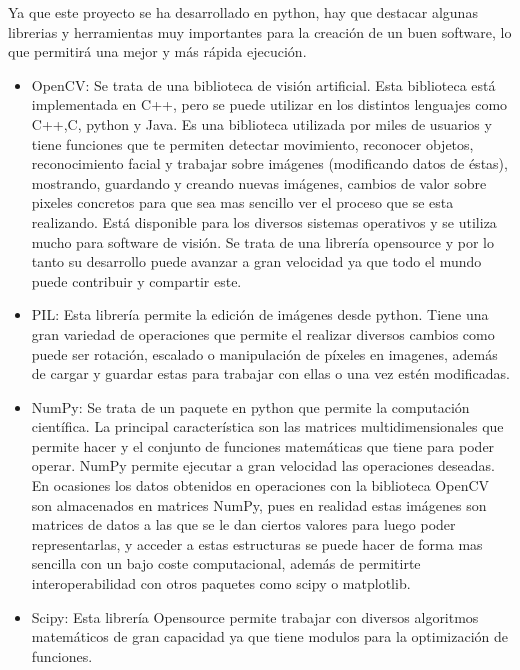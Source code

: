 \hspace{1 cm} Ya que este proyecto se ha desarrollado en python, hay que destacar algunas librerias y herramientas muy importantes para la creaci\'on de un buen software, lo que permitir\'a una mejor y m\'as r\'apida ejecuci\'on. 
	\begin{itemize}
	\item OpenCV: Se trata de una biblioteca de visi\'on artificial. Esta biblioteca est\'a implementada en C++, pero se puede utilizar en los distintos lenguajes como C++,C, python y Java. Es una biblioteca utilizada por miles de usuarios y tiene funciones que te permiten detectar movimiento, reconocer objetos, reconocimiento facial y trabajar sobre im\'agenes (modificando datos de \'estas), mostrando, guardando y creando nuevas im\'agenes, cambios de valor sobre pixeles concretos para que sea mas sencillo ver el proceso que se esta realizando. Est\'a disponible para los diversos sistemas operativos y se utiliza mucho para software de visi\'on. Se trata de una librer\'ia opensource y por lo tanto su desarrollo puede avanzar a gran velocidad ya que todo el mundo puede contribuir y compartir este.
	
	\item PIL: Esta librer\'ia permite la edici\'on de im\'agenes desde python. Tiene una gran variedad de operaciones que permite el realizar diversos cambios como puede ser rotaci\'on, escalado o manipulaci\'on de p\'ixeles en imagenes, adem\'as de cargar y guardar estas para trabajar con ellas o una vez est\'en modificadas. 
	
	\item NumPy: Se trata de un paquete en python que permite la computaci\'on cient\'ifica. La principal caracter\'istica son las matrices multidimensionales que permite hacer y el conjunto de funciones matem\'aticas que tiene para poder operar. NumPy permite ejecutar a gran velocidad las operaciones deseadas. En ocasiones los datos obtenidos en operaciones con la biblioteca OpenCV son almacenados en matrices NumPy, pues en realidad estas im\'agenes son matrices de datos a las que se le dan ciertos valores para luego poder representarlas, y acceder a estas estructuras se puede hacer de forma mas sencilla con un bajo coste computacional, adem\'as de permitirte interoperabilidad con otros paquetes como scipy o matplotlib. 

	\item Scipy: Esta librer\'ia Opensource permite trabajar con diversos algoritmos matem\'aticos de gran capacidad ya que tiene modulos para la optimizaci\'on de funciones. 
	\end{itemize}
	
